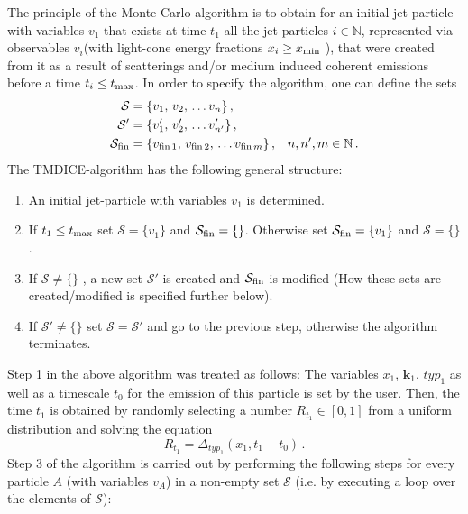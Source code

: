 \documentclass[preprint,12pt]{elsarticle}
\newcommand{\tmdice}{{\sf TMDICE}}
\begin{document}
The principle of the Monte-Carlo algorithm is to obtain for an initial jet particle with variables $v_1$ that exists at time $t_1$ all the jet-particles $i\in \mathbb{N}$, represented via  observables $v_i$(with light-cone energy fractions $x_i\geq x_{\rm min}$ ), that were created from it as a result of scatterings and/or medium induced coherent emissions before a time $t_i\leq t_{\rm max}$. 
In order to specify the algorithm, one can define the sets
%
\begin{align}
    \mathcal{S}&=\{v_{1},\,v_{2},\,\dots v_{n}\}\,,&\\
    \mathcal{S}'&=\{v'_{1},\,v'_{2},\,\dots v'_{n'}\}\,,&\\
    \mathcal{S}_{\rm fin}&=\{v_{{\rm fin}\,1},\,v_{{\rm fin}\,2},\,\dots v_{{\rm fin}\,m}\}\,,&n,n',m\in\mathbb{N}\,.
\end{align}
%
The \tmdice-algorithm has the following general structure:
\begin{enumerate}
    \item An initial jet-particle with variables $v_1$ is determined.
    \item If $t_1\leq t_{\rm max}$ set $\mathcal{S}=\{v_1\}$ and $\mathcal{S}_{\rm fin}=\{\}$.
          Otherwise set $\mathcal{S}_{\rm fin}=\{v_1\}$ and $\mathcal{S}=\{\}$.
    \item If $\mathcal{S}\neq\{\}$ , a new set $\mathcal{S}'$ is created and $\mathcal{S}_{\rm fin}$ is modified (How these sets are created/modified is specified further below).
    \item If $\mathcal{S}'\neq\{\}$ set $\mathcal{S}=\mathcal{S}'$ and go to the previous step, otherwise the algorithm terminates.
\end{enumerate}
Step 1 in the above algorithm was treated as follows:
The variables $x_1$, $\mathbf{k}_1$, $typ_1$ as well as a timescale $t_0$ for the emission of this particle is set by the user. 
Then, the time $t_1$ is obtained by randomly selecting a number $R_{t_1}\in [0,1]$ from a uniform distribution and solving the equation 
    \begin{equation}
        R_{t_1}=\Delta_{typ_1}(x_1,t_{1}-t_0)\,.
        \label{eq:tsel}
    \end{equation}
%
Step 3 of the algorithm is carried out by performing the following steps for every particle $A$ (with variables $v_A$) in a non-empty set $\mathcal{S}$ (i.e. by executing a loop over the elements of $\mathcal{S}$):
\end{document}

